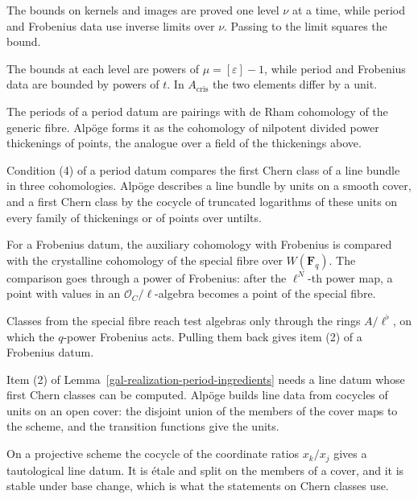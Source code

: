 The bounds on kernels and images are proved one level $\nu$ at a time, while period and Frobenius data
use inverse limits over $\nu$. Passing to the limit squares the bound.

The bounds at each level are powers of $\mu=[\varepsilon]-1$, while period and Frobenius data are bounded
by powers of $t$. In $A_{\mathrm{cris}}$ the two elements differ by a unit.

The periods of a period datum are pairings with de Rham cohomology of the generic fibre. Alpöge forms it
as the cohomology of nilpotent divided power thickenings of points, the analogue over a field of the
thickenings above.

Condition (4) of a period datum compares the first Chern class of a line bundle in three cohomologies.
Alpöge describes a line bundle by units on a smooth cover, and a first Chern class by the cocycle of
truncated logarithms of these units on every family of thickenings or of points over untilts.

For a Frobenius datum, the auxiliary cohomology with Frobenius is compared with the crystalline cohomology
of the special fibre over $W(\mathbf F_q)$. The comparison goes through a power of Frobenius: after the
$\ell^N$-th power map, a point with values in an $\mathcal O_C/\ell$-algebra becomes a point of the special
fibre.

Classes from the special fibre reach test algebras only through the rings $A/\ell^\flat$, on which the
$q$-power Frobenius acts. Pulling them back gives item (2) of a Frobenius datum.

Item (2) of Lemma~\ref{gal-realization-period-ingredients} needs a line datum whose first Chern classes can be
computed. Alpöge builds line data from cocycles of units on an open cover: the disjoint union of the members of
the cover maps to the scheme, and the transition functions give the units.

On a projective scheme the cocycle of the coordinate ratios $x_k/x_j$ gives a tautological line datum. It is
\'etale and split on the members of a cover, and it is stable under base change, which is what the statements on
Chern classes use.

